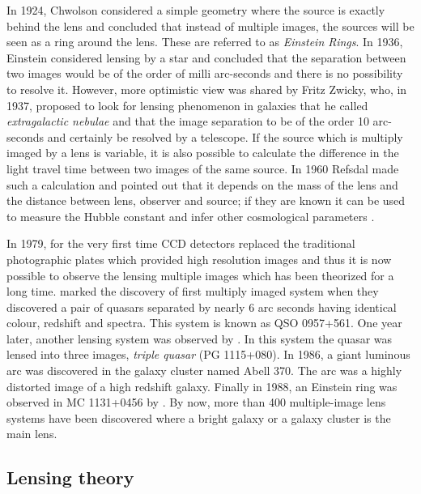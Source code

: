 In 1924, Chwolson
considered a simple geometry where the source is exactly behind the lens
and concluded that instead of multiple images, the sources will be seen
as a ring around the lens. These are referred to as {\it Einstein Rings}.
In 1936, Einstein
considered lensing by a star and concluded that the separation between two images
would be of the order of milli arc-seconds and there is no possibility to
resolve it. However, more optimistic view was shared by Fritz Zwicky, who, in 1937,
proposed to look for lensing phenomenon in galaxies that he called 
{\it extragalactic nebulae} and that the image separation to be of the order 10 arc-seconds
and certainly be resolved by a telescope. If the source which is multiply imaged
by a lens is variable, it is also possible to calculate the difference 
in the light travel time between two images of the same source. In 1960 Refsdal
made such a calculation and pointed out that it depends on the mass of the lens
and the distance between lens, observer and source; if they are known it can be 
used to measure the Hubble constant and infer other cosmological parameters
\cite{2004tomu.conf..231R}. 



In 1979, for the very first time CCD detectors replaced the traditional photographic
plates which provided high resolution 
images and thus it is now possible to observe the lensing multiple images
which has been theorized for a long time. \cite{1979Natur.279..381W} marked
the discovery of first multiply imaged system when they discovered a pair of quasars
separated by nearly 6 arc seconds having identical colour, redshift and spectra. This
system is known as QSO 0957+561. One year later, another lensing system was observed
by \cite{1980Natur.285..641W}. In this system the quasar was lensed into three
images, {\it triple quasar} (PG 1115+080). In 1986, a giant luminous
arc was discovered in the galaxy cluster named Abell 370. The arc
was a highly distorted image of a high redshift galaxy. Finally in 1988, an Einstein
ring was observed in MC 1131+0456 by \cite{1988Natur.333..537H}. By now, more than 
400 multiple-image lens systems have been discovered where a bright galaxy
or a galaxy cluster is the main lens. 





\subsection{Lensing theory}

